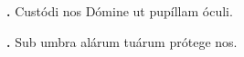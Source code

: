 \textbf{\Vbar.} Custódi nos Dómine ut pupíllam óculi.

\textbf{\Rbar.} Sub umbra alárum tuárum prótege nos.

